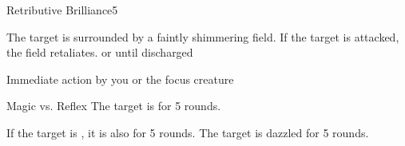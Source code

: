 \begin{spellsection}{Retributive Brilliance}{5}
\begin{spellheader}
\end{spellheader}
\begin{spellcontent}
    \begin{spelltargetinginfo}
    \end{spelltargetinginfo}
    \begin{spelleffects}
        \spelleffect The target is surrounded by a faintly shimmering field. If the target is attacked, the field retaliates.
        \spelldur \durshort or until discharged
    \end{spelleffects}
\end{spellcontent}
\begin{spellsubcontent}
    \begin{spelltargetinginfo}
    \end{spelltargetinginfo}
    \begin{spelleffects}
         Immediate action by you or the focus creature
        \begin{spellattack}{Magic vs. Reflex}
            \spellsuccess The target is \dazzled for 5 rounds.

            If the target is \bloodied, it is also \blinded for 5 rounds.
            \spellfailure The target is dazzled for 5 rounds.
        \end{spellattack}
    \end{spelleffects}
\end{spellsubcontent}
\begin{spellfooter}
\end{spellfooter}
\end{spellsection}

